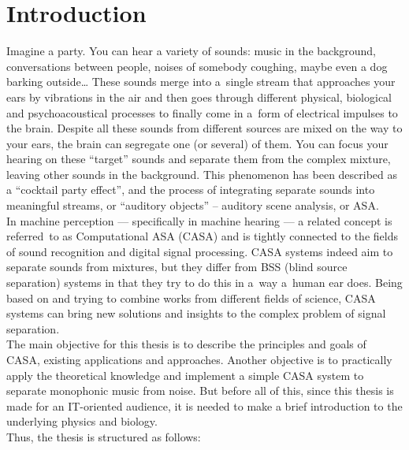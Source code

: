 \chapter{Introduction}

Imagine a party. You can hear a variety of sounds: music in the background, conversations between people, noises of somebody coughing, maybe even a dog barking outside\dots{} These sounds merge into a~single stream that approaches your ears by vibrations in the air and then goes through different physical, biological and psychoacoustical processes to finally come in a~form of electrical impulses to the brain. Despite all these sounds from different sources are mixed on the way to your ears, the brain can segregate one (or several) of them. You can focus your hearing on these “target” sounds and separate them from the complex mixture, leaving other sounds in the background. This phenomenon has been described as a “cocktail party effect”, and the process of integrating separate sounds into meaningful streams, or “auditory objects” -- auditory scene analysis, or ASA.\\

In machine perception --- specifically in machine hearing --- a related concept is referred~to as Computational ASA (CASA) and is tightly connected to the fields of sound recognition and digital signal processing. CASA systems indeed aim to separate sounds from mixtures, but they differ from BSS (blind source separation) systems in that they try to do this in a~way a~human ear does. Being based on and trying to combine works from different fields of science, CASA systems can bring new solutions and insights to the complex problem of signal separation.\\

The main objective for this thesis is to describe the principles and goals of CASA, existing applications and approaches. Another objective is to practically apply the theoretical knowledge and implement a simple CASA system to separate monophonic music from noise. But before all of this, since this thesis is made for an IT-oriented audience, it is needed to make a brief introduction to the underlying physics and biology.\\

Thus, the thesis is structured as follows:

